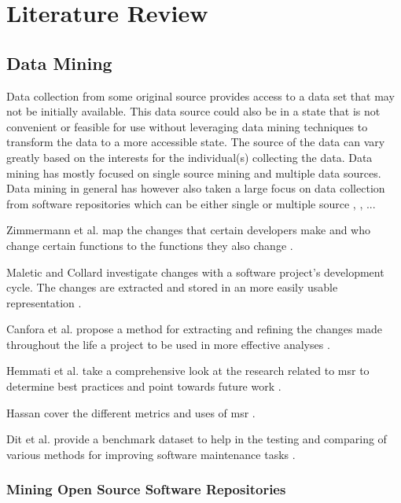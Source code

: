 \chapter{Literature Review}
\label{chap:related_works}


\section{Data Mining}

Data collection from some original source provides access to a data set that may not be initially available. This data source could also be in a state that is not convenient or feasible for use without leveraging data mining techniques to transform the data to a more accessible state. The source of the data can vary greatly based on the interests for the individual(s) collecting the data. Data mining has mostly focused on single source mining and multiple data sources. Data mining in general has however also taken a large focus on data collection from software repositories which can be either single or multiple source \cite{Hemmati2013}, \cite{Hassan2006}, ... %

Zimmermann et al. map the changes that certain developers make and who change certain functions to the functions they also change \cite{Zimmermann2005a}. 

Maletic and Collard investigate changes with a software project's development cycle. The changes are extracted and stored in an more easily usable representation \cite{Maletic2004}.

Canfora et al. propose a method for extracting and refining the changes made throughout the life a project to be used in more effective analyses \cite{Canfora2007c}.

Hemmati et al. take a comprehensive look at the research related to \gls{msr} to determine best practices and point towards future work \cite{Hemmati2013}.

Hassan cover the different metrics and uses of \gls{msr} \cite{Hassan2006}.

Dit et al. provide a benchmark dataset to help in the testing and comparing of various methods for improving software maintenance tasks \cite{Dit2013}.

\subsection{Mining Open Source Software Repositories}

